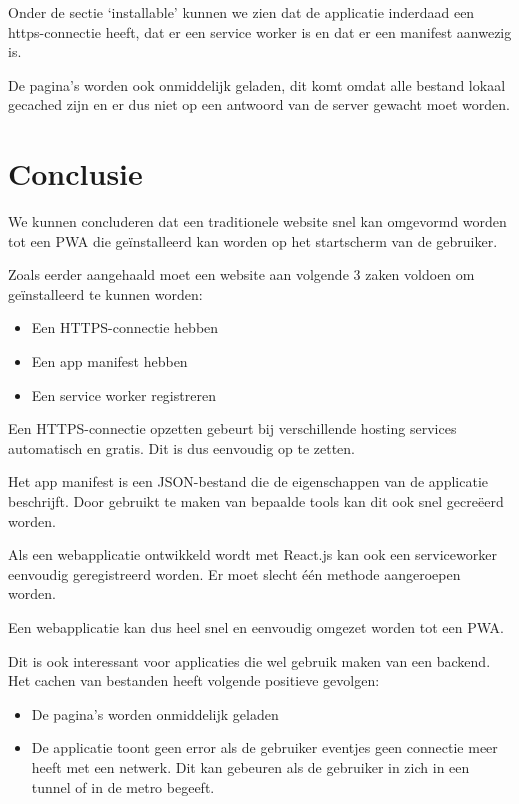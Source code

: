 	Onder de sectie ‘installable’ kunnen we zien dat de applicatie inderdaad een https-connectie heeft, dat er een service worker is en dat er een manifest aanwezig is.
	
	De pagina's worden ook onmiddelijk geladen, dit komt omdat alle bestand lokaal gecached zijn en er dus niet op een antwoord van de server gewacht moet worden.
	
\section{Conclusie}

	We kunnen concluderen dat een traditionele website snel kan omgevormd worden tot een PWA die geïnstalleerd kan worden op het startscherm van de gebruiker. 
	
	Zoals eerder aangehaald moet een website aan volgende 3 zaken voldoen om geïnstalleerd te kunnen worden:
	\begin{itemize}
		\item Een HTTPS-connectie hebben
		\item Een app manifest hebben
		\item Een service worker registreren
	\end{itemize}	
	
	Een HTTPS-connectie opzetten gebeurt bij verschillende hosting services automatisch en gratis. Dit is dus eenvoudig op te zetten.
	
	Het app manifest is een JSON-bestand die de eigenschappen van de applicatie beschrijft. Door gebruikt te maken van bepaalde tools kan dit ook snel gecreëerd worden.
	
	Als een webapplicatie ontwikkeld wordt met React.js kan ook een serviceworker eenvoudig geregistreerd worden. Er moet slecht één methode aangeroepen worden.
	
	Een webapplicatie kan dus heel snel en eenvoudig omgezet worden tot een PWA.
	
	Dit is ook interessant voor applicaties die wel gebruik maken van een backend. Het cachen van bestanden heeft volgende positieve gevolgen:
	\begin{itemize}
		\item De pagina's worden onmiddelijk geladen
		\item De applicatie toont geen error als de gebruiker eventjes geen connectie meer heeft met een netwerk. Dit kan gebeuren als de gebruiker in zich in een tunnel of in de metro begeeft.
	\end{itemize}	
	
